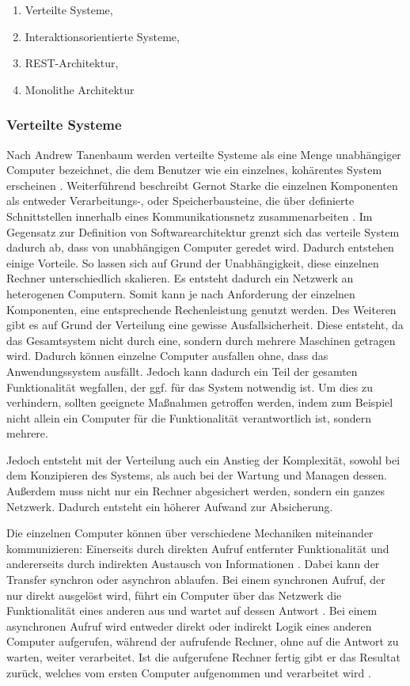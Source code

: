 \begin{enumerate}
	\item Verteilte Systeme,
	\item Interaktionsorientierte Systeme,
	\item REST-Architektur,
	\item Monolithe Architektur
\end{enumerate}

\subsubsection{Verteilte Systeme}

Nach Andrew Tanenbaum werden verteilte Systeme als eine Menge unabhängiger Computer bezeichnet, die dem Benutzer wie ein einzelnes, kohärentes System erscheinen \parencite{tanenbaum_verteilte_2007}. Weiterführend beschreibt Gernot Starke die einzelnen Komponenten als entweder Verarbeitungs-, oder Speicherbausteine, die über definierte Schnittstellen innerhalb eines Kommunikationsnetz zusammenarbeiten \parencite[vlg.][S. 116]{starke_effektive_2015}. Im Gegensatz zur Definition von Softwarearchitektur grenzt sich das verteile System dadurch ab, dass von unabhängigen Computer geredet wird. Dadurch entstehen einige Vorteile. So lassen sich auf Grund der Unabhängigkeit, diese einzelnen Rechner unterschiedlich skalieren. Es entsteht dadurch ein Netzwerk an heterogenen Computern. Somit kann je nach Anforderung der einzelnen Komponenten, eine entsprechende Rechenleistung genutzt werden. Des Weiteren gibt es auf Grund der Verteilung eine gewisse Ausfallsicherheit. Diese entsteht, da das Gesamtsystem nicht durch eine, sondern durch mehrere Maschinen getragen wird. Dadurch können einzelne Computer ausfallen ohne, dass das Anwendungssystem ausfällt. Jedoch kann dadurch ein Teil der gesamten Funktionalität wegfallen, der ggf. für das System notwendig ist. Um dies zu verhindern, sollten geeignete Maßnahmen getroffen werden, indem zum Beispiel nicht allein ein Computer für die Funktionalität verantwortlich ist, sondern mehrere.

Jedoch entsteht mit der Verteilung auch ein Anstieg der Komplexität, sowohl bei dem Konzipieren des Systems, als auch bei der Wartung und Managen dessen. Außerdem muss nicht nur ein Rechner abgesichert werden, sondern ein ganzes Netzwerk. Dadurch entsteht ein höherer Aufwand zur Absicherung.

Die einzelnen Computer können über verschiedene Mechaniken miteinander kommunizieren: Einerseits durch direkten Aufruf entfernter Funktionalität und andererseits durch indirekten Austausch von Informationen \parencite[vlg.][S. 116]{starke_effektive_2015}. Dabei kann der Transfer synchron oder asynchron ablaufen. Bei einem synchronen Aufruf, der nur direkt ausgelöst wird, führt ein Computer über das Netzwerk die Funktionalität eines anderen aus und wartet auf dessen Antwort \parencite{synchrone_2018}.
Bei einem asynchronen Aufruf wird entweder direkt oder indirekt Logik eines anderen Computer aufgerufen, während der aufrufende Rechner, ohne auf die Antwort zu warten, weiter verarbeitet. Ist die aufgerufene Rechner fertig gibt er das Resultat zurück, welches vom ersten Computer aufgenommen und verarbeitet wird \parencite{wiki_asynchrone_2019}.

